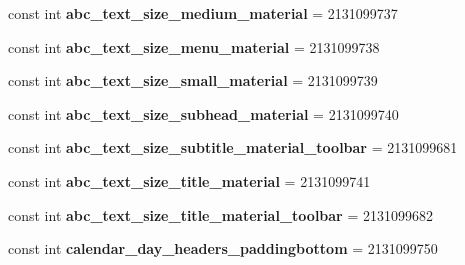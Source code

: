 \begin{DoxyCompactItemize}
\item 
\hypertarget{classClient_1_1Droid_1_1Resource_1_1Dimension_afe09aa3630892cb394c7e1e90a9b2144}{}const int {\bfseries abc\+\_\+text\+\_\+size\+\_\+medium\+\_\+material} = 2131099737\label{classClient_1_1Droid_1_1Resource_1_1Dimension_afe09aa3630892cb394c7e1e90a9b2144}

\item 
\hypertarget{classClient_1_1Droid_1_1Resource_1_1Dimension_a1e6fc04148089b272e1c20ac0ae9bafe}{}const int {\bfseries abc\+\_\+text\+\_\+size\+\_\+menu\+\_\+material} = 2131099738\label{classClient_1_1Droid_1_1Resource_1_1Dimension_a1e6fc04148089b272e1c20ac0ae9bafe}

\item 
\hypertarget{classClient_1_1Droid_1_1Resource_1_1Dimension_a962e8b0820146de1face4a3433766f1f}{}const int {\bfseries abc\+\_\+text\+\_\+size\+\_\+small\+\_\+material} = 2131099739\label{classClient_1_1Droid_1_1Resource_1_1Dimension_a962e8b0820146de1face4a3433766f1f}

\item 
\hypertarget{classClient_1_1Droid_1_1Resource_1_1Dimension_aef0b4ef039f8f0ff0d84a6444ed04a2f}{}const int {\bfseries abc\+\_\+text\+\_\+size\+\_\+subhead\+\_\+material} = 2131099740\label{classClient_1_1Droid_1_1Resource_1_1Dimension_aef0b4ef039f8f0ff0d84a6444ed04a2f}

\item 
\hypertarget{classClient_1_1Droid_1_1Resource_1_1Dimension_a2f9a55a6d1ab3a34aa326d6c579fc16f}{}const int {\bfseries abc\+\_\+text\+\_\+size\+\_\+subtitle\+\_\+material\+\_\+toolbar} = 2131099681\label{classClient_1_1Droid_1_1Resource_1_1Dimension_a2f9a55a6d1ab3a34aa326d6c579fc16f}

\item 
\hypertarget{classClient_1_1Droid_1_1Resource_1_1Dimension_ad598aff492267ad4bafef4705d9a8c68}{}const int {\bfseries abc\+\_\+text\+\_\+size\+\_\+title\+\_\+material} = 2131099741\label{classClient_1_1Droid_1_1Resource_1_1Dimension_ad598aff492267ad4bafef4705d9a8c68}

\item 
\hypertarget{classClient_1_1Droid_1_1Resource_1_1Dimension_ad38e6463ca8fcd2b1afd2467bb551e10}{}const int {\bfseries abc\+\_\+text\+\_\+size\+\_\+title\+\_\+material\+\_\+toolbar} = 2131099682\label{classClient_1_1Droid_1_1Resource_1_1Dimension_ad38e6463ca8fcd2b1afd2467bb551e10}

\item 
\hypertarget{classClient_1_1Droid_1_1Resource_1_1Dimension_a47bf251fdbcbf0027485d8c5b72ab33a}{}const int {\bfseries calendar\+\_\+day\+\_\+headers\+\_\+paddingbottom} = 2131099750\label{classClient_1_1Droid_1_1Resource_1_1Dimension_a47bf251fdbcbf0027485d8c5b72ab33a}


\end{DoxyCompactItemize}
